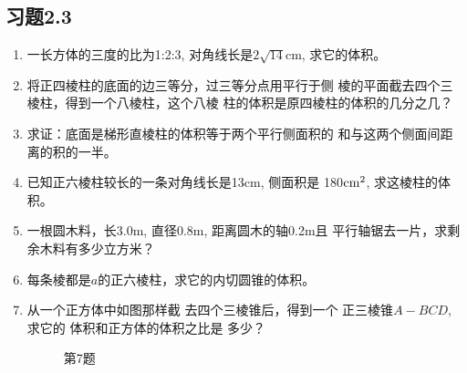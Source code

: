 \subsection*{习题2.3}
\begin{enumerate}
    \item 一长方体的三度的比为1:2:3, 对角线长是$2\sqrt{14}$cm, 求它的体积。
    \item 将正四棱柱的底面的边三等分，过三等分点用平行于侧
    棱的平面截去四个三棱柱，得到一个八棱柱，这个八棱
    柱的体积是原四棱柱的体积的几分之几？
    \item 求证：底面是梯形直棱柱的体积等于两个平行侧面积的
    和与这两个侧面间距离的积的一半。
    \item 已知正六棱柱较长的一条对角线长是13cm, 侧面积是
    180${\rm cm^2}$, 求这棱柱的体积。
    \item 一根圆木料，长3.0m, 直径0.8m, 距离圆木的轴0.2m且
    平行轴锯去一片，求剩余木料有多少立方米？
    \item 每条棱都是$a$的正六棱柱，求它的内切圆锥的体积。
    \item 从一个正方体中如图那样截
    去四个三棱锥后，得到一个
    正三棱锥$A-BCD$, 求它的
    体积和正方体的体积之比是
    多少？

\begin{figure}[htp]
    \centering
    \caption*{第7题}
\end{figure}


\end{enumerate}

